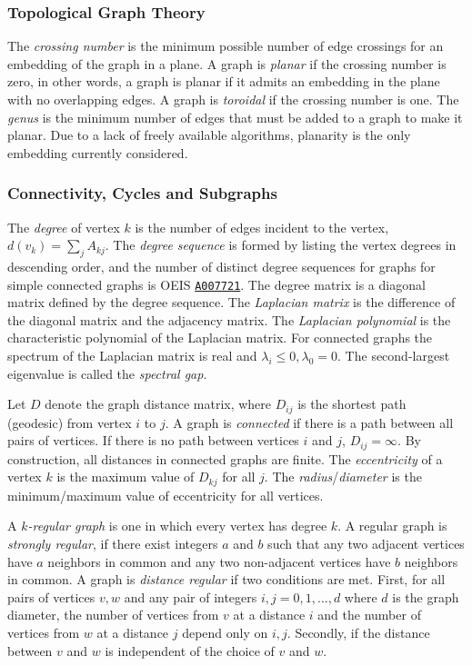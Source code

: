 \documentclass[12pt]{article}
\newcommand{\OEIS}[1]
{\href{https://oeis.org/#1}{\texttt{#1}}}
\begin{document}
\begin{appendices}
\subsubsection*{Topological Graph Theory}

The \textit{crossing number} is the minimum possible number of edge crossings for an embedding of the graph in a plane.
A graph is \textit{planar} if the crossing number is zero, in other words, a graph is planar if it admits an embedding in the plane with no overlapping edges.
A graph is \textit{toroidal} if the crossing number is one.
The \textit{genus} is the minimum number of edges that must be added to a graph to make it planar.
Due to a lack of freely available algorithms, planarity is the only embedding currently considered.

\subsubsection*{Connectivity, Cycles and Subgraphs}

The \textit{degree} of vertex $k$ is the number of edges incident to the vertex, $d(v_k) = \sum_j A_{k j}$. 
The \textit{degree sequence} is formed by listing the vertex degrees in descending order, and the number of distinct degree sequences for graphs for simple connected graphs is OEIS \OEIS{A007721}.
The degree matrix is a diagonal matrix defined by the degree sequence.
The \textit{Laplacian matrix} is the difference of the diagonal matrix and the adjacency matrix.
The \textit{Laplacian polynomial} is the characteristic polynomial of the Laplacian matrix.
For connected graphs the spectrum of the Laplacian matrix is real and $\lambda_i \le 0, \lambda_0 = 0$.
The second-largest eigenvalue is called the \textit{spectral gap}.

Let $D$ denote the graph distance matrix, where $D_{ij}$ is the shortest path (geodesic) from vertex $i$ to $j$.
A graph is \textit{connected} if there is a path between all pairs of vertices.
If there is no path between vertices $i$ and $j$, $D_{ij}=\infty$.
By construction, all distances in connected graphs are finite.
The \textit{eccentricity} of a vertex $k$ is the maximum value of $D_{k j}$ for all $j$.
The \textit{radius}/\textit{diameter} is the minimum/maximum value of eccentricity for all vertices.

A \textit{$k$-regular graph} is one in which every vertex has degree $k$. 
A regular graph is \textit{strongly regular}, if there exist integers $a$ and $b$ such that any two adjacent vertices have $a$ neighbors in common and any two non-adjacent vertices have $b$ neighbors in common. 
A graph is \textit{distance regular} if two conditions are met. 
First, for all pairs of vertices $v, w$ and any pair of integers $i,j = 0,1,\ldots,d$ where $d$ is the graph diameter, the number of vertices from $v$ at a distance $i$ and the number of vertices from $w$ at a distance $j$ depend only on $i, j$.
Secondly, if the distance between $v$ and $w$ is independent of the choice of $v$ and $w$\cite{brouwer2012distance}.


\end{appendices}
\end{document}
